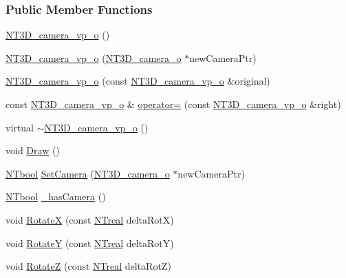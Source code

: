 \subsubsection*{Public Member Functions}
\begin{DoxyCompactItemize}
\item 
\hyperlink{class_n_t3_d__camera__vp__o_af70461c4fbda374038465239a5a07b25}{NT3D\_\-camera\_\-vp\_\-o} ()
\item 
\hyperlink{class_n_t3_d__camera__vp__o_a3da8c546d59eee3923443493b607d9f9}{NT3D\_\-camera\_\-vp\_\-o} (\hyperlink{class_n_t3_d__camera__o}{NT3D\_\-camera\_\-o} $\ast$newCameraPtr)
\item 
\hyperlink{class_n_t3_d__camera__vp__o_aaef5aaa85c5bc56d75cfbf29670672e3}{NT3D\_\-camera\_\-vp\_\-o} (const \hyperlink{class_n_t3_d__camera__vp__o}{NT3D\_\-camera\_\-vp\_\-o} \&original)
\item 
const \hyperlink{class_n_t3_d__camera__vp__o}{NT3D\_\-camera\_\-vp\_\-o} \& \hyperlink{class_n_t3_d__camera__vp__o_ac2263c1d08dbe23a4d36af441fb37be0}{operator=} (const \hyperlink{class_n_t3_d__camera__vp__o}{NT3D\_\-camera\_\-vp\_\-o} \&right)
\item 
virtual \hyperlink{class_n_t3_d__camera__vp__o_abfad07e194200961cdeafccb90a3f99e}{$\sim$NT3D\_\-camera\_\-vp\_\-o} ()
\item 
void \hyperlink{class_n_t3_d__camera__vp__o_a21cea10d6b586143ecf025cb45888b04}{Draw} ()
\item 
\hyperlink{nt__types_8h_a9f3200824a52174bb5be77bed3838822}{NTbool} \hyperlink{class_n_t3_d__camera__vp__o_abd626c2a3d8d088e8ea973656242c3b3}{SetCamera} (\hyperlink{class_n_t3_d__camera__o}{NT3D\_\-camera\_\-o} $\ast$newCameraPtr)
\item 
\hyperlink{nt__types_8h_a9f3200824a52174bb5be77bed3838822}{NTbool} \hyperlink{class_n_t3_d__camera__vp__o_af3fb1aed7f225c15eac5610b0a81631e}{\_\-hasCamera} ()
\item 
void \hyperlink{class_n_t3_d__camera__vp__o_a965b1b86f4cc1892115f70a4536e7548}{RotateX} (const \hyperlink{nt__types_8h_a814a97893e9deb1eedcc7604529ba80d}{NTreal} deltaRotX)
\item 
void \hyperlink{class_n_t3_d__camera__vp__o_abf5bb05ddc005d16c4b7576b3a2f1015}{RotateY} (const \hyperlink{nt__types_8h_a814a97893e9deb1eedcc7604529ba80d}{NTreal} deltaRotY)
\item 
void \hyperlink{class_n_t3_d__camera__vp__o_a6c628d4698d8cb8c92ecbf3dfecd91db}{RotateZ} (const \hyperlink{nt__types_8h_a814a97893e9deb1eedcc7604529ba80d}{NTreal} deltaRotZ)

\end{DoxyCompactItemize}
